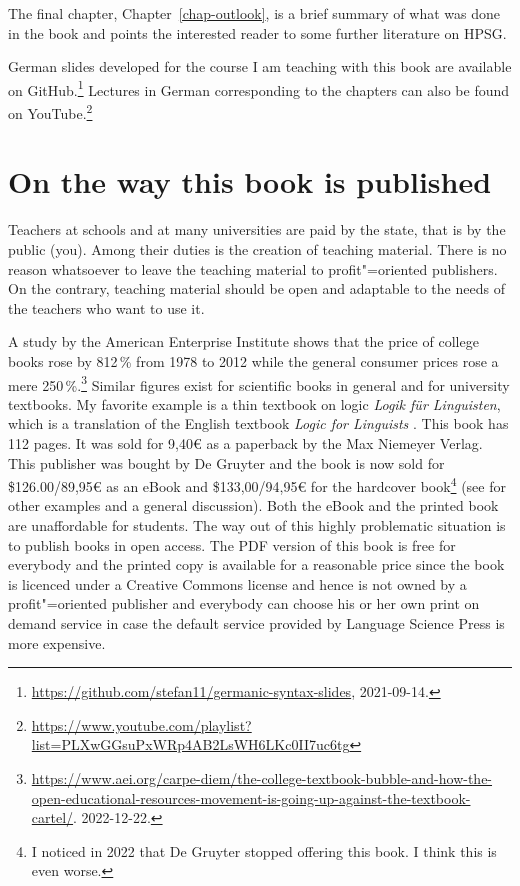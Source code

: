 
The final chapter, Chapter~\ref{chap-outlook}, is a brief summary of what was done in the book and
points the interested reader to some further literature on HPSG.

German slides developed for the course I am teaching with this book are available on GitHub.\footnote{
\url{https://github.com/stefan11/germanic-syntax-slides}, 2021-09-14.
}
Lectures in German corresponding to the chapters can also be found on YouTube.\footnote{
\url{https://www.youtube.com/playlist?list=PLXwGGsuPxWRp4AB2LsWH6LKc0II7uc6tg}
}

\section*{On the way this book is published}

Teachers at schools and at many universities are paid by the state, that is by the public (you). Among
their duties is the creation of teaching material. There is no reason whatsoever to leave the
teaching material to profit"=oriented publishers. On the contrary, teaching material should be open
and adaptable to the needs of the teachers who want to use it. 

A study by the American Enterprise Institute shows that the price of college books rose by 812\,\%
from 1978 to 2012 while the general consumer prices rose a mere 250\,\%.\footnote{
\url{https://www.aei.org/carpe-diem/the-college-textbook-bubble-and-how-the-open-educational-resources-movement-is-going-up-against-the-textbook-cartel/}.
2022-12-22.%
} Similar figures exist for scientific books in general and for university textbooks. My favorite example is a thin textbook
on logic \emph{Logik für Linguisten}, which is a translation of the English textbook \emph{Logic for
Linguists} \citep{AAD73a}. This book has 112 pages. It was sold for 9,40€ as a paperback by the Max Niemeyer
Verlag. This publisher was bought by De Gruyter and the book is now sold for \$126.00/89,95€ as an
eBook and \$133,00/94,95€ for the hardcover book\footnote{
I noticed in 2022 that De Gruyter stopped offering this book. I think this is even worse.
} (see \citealp{MuellerOA} for other examples and a general discussion). Both the eBook and the printed book are unaffordable for students. The way out of this highly
problematic situation is to publish books in open access. The PDF version of this book is free for
everybody and the printed copy is available for a reasonable price since the book is licenced under
a Creative Commons license and hence is not owned by a
profit"=oriented publisher and everybody can choose his or her own print on demand service in case
the default service provided by Language Science Press is more expensive.

